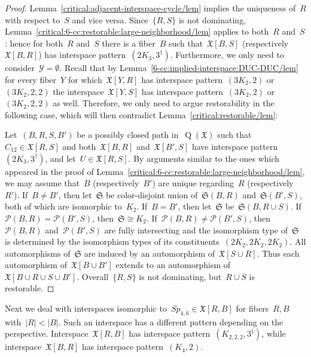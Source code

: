 \documentclass[english,a4paper]{article}
\theoremstyle{plain}
\theoremstyle{definition}
\newcommand{\coherentConfig}{\ensuremath{\mathfrak{X}}}
\newcommand{\interspace}[2]{\ensuremath{\coherentConfig[#1,#2]}}
\newcommand{\inducedCC}[1]{\ensuremath{\coherentConfig[#1]}}
\DeclareMathOperator*{\Quotient}{Q}
\newcommand{\quotientGraph}[1]{\ensuremath{\Quotient(#1)}}
\newcommand{\equivalenceClasses}[1]{\ensuremath{\mathcal{P}(#1)}}
\newcommand{\partitionStructure}[1]{\ensuremath{\mathfrak{S}(#1)}}
\newcommand{\ipfourClique}  {\ensuremath{(\clique{4},2)}}
\newcommand{\ipsixMatching}             {\ensuremath{(\disjointCliques{3}{2},2)}}
\newcommand{\ipsixMatchingTwice}        {\ensuremath{(\disjointCliques{3}{2},2,2)}}
\newcommand{\ipsixTriangle}               {\ensuremath{(\disjointCliques{2}{3},3^\dag)}}
\newcommand{\ipsixMatchingComplementD}{\ensuremath{(\clique{2,2,2},3^\ddag)}}
\newcommand{\clique}[1]{\ensuremath{K_{#1}}}
\newcommand{\cycle}[1]{\ensuremath{C_{#1}}}
\newcommand{\disjointCliques}[2]{\ensuremath{#1 \clique{#2}}}
\newcommand{\interspaceFourSix}{\ensuremath{Sp_{4,6}}}
\begin{document}
\begin{proof}
    Lemma~\ref{critical:adjacent-interspace-cycle/lem} implies the uniqueness of~$R$ with respect to~$S$ and vice versa.
    Since~$\{R,S\}$ is not dominating, Lemma~\ref{critical:6-cc:restorable:large-neighborhood/lem} applies to both~$R$ and~$S$:
    hence for both~$R$ and~$S$ there is a fiber~$B$ such that~$\interspace{B}{S}$ (respectively~$\interspace{B}{R}$) has interspace pattern~$\ipsixTriangle$.
    Furthermore, we only need to consider~$\mathcal{Y} = \emptyset$.
    Recall that by Lemma~\ref{6-cc:implied-interspace:DUC-DUC/lem} for every fiber~$Y$ for which~$\interspace{Y}{R}$ has interspace pattern~$\ipsixMatching$ or~$\ipsixMatchingTwice$ the interspace~$\interspace{Y}{S}$ has interspace pattern~$\ipsixMatching$ or~$\ipsixMatchingTwice$ as well.
    Therefore, we only need to argue restorability in the following case, which will then contradict Lemma~\ref{critical:restorable/lem}:

    Let~$(B,R,S,B')$ be a possibly closed path in~$\quotientGraph{\coherentConfig}$ such that~$\cycle{12} \in \interspace{R}{S}$ and both~$\interspace{B}{R}$ and~$\interspace{B'}{S}$ have interspace pattern~$\ipsixTriangle$, and let~$U \in \interspace{R}{S}$.
    By arguments similar to the ones which appeared in the proof of Lemma~\ref{critical:6-cc:restorable:large-neighborhood/lem}, we may assume that~$B$ (respectively~$B'$) are unique regarding~$R$ (respectively~$R'$).
    If~$B \neq B'$, then let~$\mathfrak{S}$ be color-disjoint union of~$\partitionStructure{B,R}$ and~$\partitionStructure{B',S}$, both of which are isomorphic to~$K_2$.
    If~$B = B'$, then let~$\mathfrak{S}$ be~$\partitionStructure{B,R \cup S}$.
    If~$\equivalenceClasses{B,R} = \equivalenceClasses{B',S}$, then~$\mathfrak{S} \cong K_2$.
    If~$\equivalenceClasses{B,R} \neq \equivalenceClasses{B',S}$, then~$\equivalenceClasses{B,R}$ and~$\equivalenceClasses{B',S}$ are fully intersecting and the isomorphism type of~$\mathfrak{S}$ is determined by the isomorphism types of its constituents~$(2K_2,2K_2,2K_2)$.
    All automorphisms of~$\mathfrak{S}$ are induced by an automorphism of~$\inducedCC{S \cup R}$.
    Thus each automorphism of~$\inducedCC{B \cup B'}$ extends to an automorphism of~$\inducedCC{B \cup R \cup S \cup B'}$.
    Overall~$\{R,S\}$ is not dominating, but~$R \cup S$ is restorable.
\end{proof}


Next we deal with interspaces isomorphic to~$\interspaceFourSix \in \interspace{R}{B}$ for fibers~$R,B$ with~$|R| < |B|$.
Such an interspace has a different pattern depending on the perspective.
Interspace~$\interspace{R}{B}$ has interspace pattern~$\ipsixMatchingComplementD$, while interspace~$\interspace{B}{R}$ has interspace pattern~$\ipfourClique$.
\end{document}
